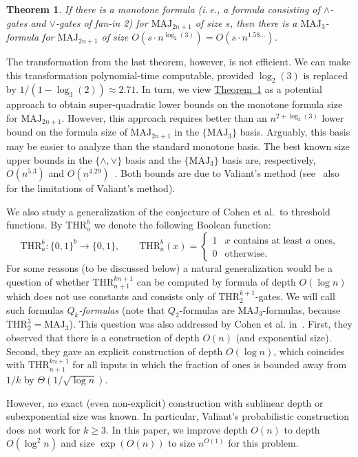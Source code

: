 \documentclass[11pt]{article}
\numberwithin{equation}{section}
\newtheorem{theorem}{Theorem}[section]
\theoremstyle{definition}
\theoremstyle{plain}
\newcommand{\ie}{i.\,e.}
\newcommand{\expref}[2]{\hyperref[#2]{#1~\ref{#2}}}
\def\MAJ{\mathrm{MAJ}}
\def\THR{\mathrm{THR}}
\begin{document}
\begin{theorem}
\label{transformation}
If there is a monotone formula (\ie, a formula consisting of $\land$-gates and $\lor$-gates of fan-in 2) for $\MAJ_{2n + 1}$ of size $s$, then there is a $\MAJ_3$-formula for $\MAJ_{2n + 1}$ of size $O(s \cdot n^{\log_2(3)}) = O(s \cdot n^{1.58\ldots})$.
\end{theorem}
The transformation from the last theorem, however, is not efficient. We can make this transformation polynomial-time computable, provided $\log_2(3)$ is replaced by $1/(1 - \log_3(2)) \approx 2.71$.  In turn, we view \expref{Theorem}{transformation}
as a potential approach to obtain super-quadratic lower bounds on the monotone formula size for $\MAJ_{2n + 1}$. However, this approach requires better than an $n^{2 +\log_2(3)}$ lower bound on the formula size of $\MAJ_{2n + 1}$ in the $\{\MAJ_3\}$ basis. Arguably, this basis may be easier to analyze than the standard monotone basis. The best known size upper bounds  in the $\{\land, \lor\}$ basis and the $\{\MAJ_3\}$ basis are, respectively, $O(n^{5.3})$ and $O(n^{4.29})$~\cite{GM96}. Both bounds are due to Valiant's method (see~\cite{GM96} also for the limitations of Valiant's method). 

We also study a generalization of the conjecture of Cohen et al.~to threshold functions. By $\THR^b_a$ we denote the following Boolean function:
\[\THR^b_a\colon\{0, 1\}^b \to \{0, 1\}, \qquad \THR^b_a(x) = \begin{cases} 1 & \mbox{$x$ contains at least $a$ ones,} \\ 0 &\mbox{otherwise.} \end{cases}\]
For some reasons (to be discussed below) a natural generalization would be a question of whether $\THR^{kn + 1}_{n + 1}$ can be computed by 
%
formula of depth $O(\log n)$  %
which does not use constants and consists only of $\THR^{k+1}_2$-gates. We will call such formulas \emph{$Q_k$-formulas} (note that $Q_2$-formulas are $\MAJ_3$-formulas, because $\THR^{3}_2 = \MAJ_3$). This question was also addressed by Cohen et al. in~\cite{Cohen2013}. First, they observed that there is a construction of depth $O(n)$ (and exponential size).
%
Second,  %
they gave an explicit construction of depth $O(\log n)$, which coincides with $\THR^{kn + 1}_{n + 1}$ for all inputs in which the fraction of ones is bounded away from $1/k$ by $\Theta(1/\sqrt{\log n})$.



However, no exact (even non-explicit) construction with sublinear depth or
subexponential size was known. In particular, Valiant's probabilistic construction does not work for $k\ge 3$.
%
%
%
In this paper, we improve
%
depth $O(n)$ to depth $O(\log^2 n)$ and   %
%
size $\exp\left(O(n)\right)$ to size $n^{O(1)}$
for this problem.
\end{document}
